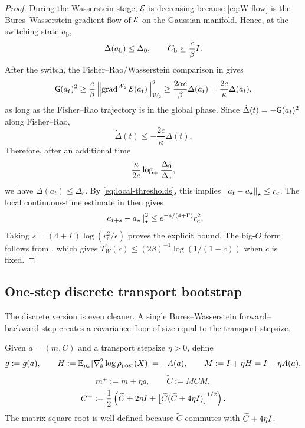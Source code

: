 \begin{proof}
During the Wasserstein stage, $\mathcal{E}$ is decreasing because \eqref{eq:W-flow} is the
Bures--Wasserstein gradient flow of $\mathcal{E}$ on the Gaussian manifold. Hence, at the switching
state $a_{\mathrm b}$,
\[
    \Delta(a_{\mathrm b})\le\Delta_0,
    \qquad
    C_{\mathrm b}\succeq \frac c\beta I.
\]
After the switch, the Fisher--Rao/Wasserstein comparison in  gives
\[
    \mathsf{G}(a_t)^2
    \ge
    \frac c\beta\left\lVert \operatorname{grad}^{W_2}\mathcal{E}(a_t)\right\rVert_{W_2}^2
    \ge
    \frac{2\alpha c}{\beta}\Delta(a_t)
    =
    \frac{2c}{\kappa}\Delta(a_t),
\]
as long as the Fisher--Rao trajectory is in the global phase. Since
$\dot\Delta(t)=-\mathsf{G}(a_t)^2$ along Fisher--Rao,
\[
    \dot\Delta(t)
    \le
    -\frac{2c}{\kappa}\Delta(t).
\]
Therefore, after an additional time
\[
    \frac{\kappa}{2c}\log_+\frac{\Delta_0}{\Delta_{\mathrm c}},
\]
we have $\Delta(a_t)\le\Delta_{\mathrm c}$. By \eqref{eq:local-thresholds}, this implies
$\left\lVert a_t-a_\star\right\rVert_\star\le r_{\mathrm c}$. The local continuous-time estimate in
 then gives
\[
    \left\lVert a_{t+s}-a_\star\right\rVert_\star^2
    \le
    e^{-s/(4+\Gamma)}r_{\mathrm c}^2.
\]
Taking $s=(4+\Gamma)\log(r_{\mathrm c}^2/\epsilon)$ proves the explicit bound. The big-$O$
form follows from , which gives
$T_W^{\mathrm c}(c)\le (2\beta)^{-1}\log(1/(1-c))$ when $c$ is fixed.
\end{proof}

\subsection{One-step discrete transport bootstrap}

The discrete version is even cleaner. A single Bures--Wasserstein forward--backward step creates
a covariance floor of size equal to the transport stepsize.

Given $a=(m,C)$ and a transport stepsize $\eta>0$, define
\begin{equation}
\label{eq:W-FB-step}
    g:=g(a),
    \qquad
    H:=\mathbb{E}_{\rho_a}[\nabla_\theta^2\log\rho_{\mathrm{post}}(X)]=-A(a),
    \qquad
    M:=I+\eta H=I-\eta A(a),
\end{equation}
\[
    m^+:=m+\eta g,
    \qquad
    \widetilde C:=MCM,
\]
\begin{equation}
\label{eq:W-FB-cov}
    C^+
    :=
    \frac12
    \left(
        \widetilde C+2\eta I+\bigl[\widetilde C(\widetilde C+4\eta I)\bigr]^{1/2}
    \right).
\end{equation}
The matrix square root is well-defined because $\widetilde C$ commutes with
$\widetilde C+4\eta I$.

